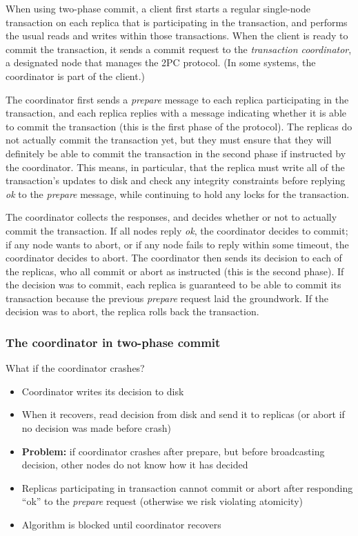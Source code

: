 When using two-phase commit, a client first starts a regular single-node transaction on each replica that is participating in the transaction, and performs the usual reads and writes within those transactions.
When the client is ready to commit the transaction, it sends a commit request to the \emph{transaction coordinator}, a designated node that manages the 2PC protocol.
(In some systems, the coordinator is part of the client.)

The coordinator first sends a \emph{prepare} message to each replica participating in the transaction, and each replica replies with a message indicating whether it is able to commit the transaction (this is the first phase of the protocol).
The replicas do not actually commit the transaction yet, but they must ensure that they will definitely be able to commit the transaction in the second phase if instructed by the coordinator.
This means, in particular, that the replica must write all of the transaction's updates to disk and check any integrity constraints before replying \emph{ok} to the \emph{prepare} message, while continuing to hold any locks for the transaction.

The coordinator collects the responses, and decides whether or not to actually commit the transaction.
If all nodes reply \emph{ok}, the coordinator decides to commit; if any node wants to abort, or if any node fails to reply within some timeout, the coordinator decides to abort.
The coordinator then sends its decision to each of the replicas, who all commit or abort as instructed (this is the second phase).
If the decision was to commit, each replica is guaranteed to be able to commit its transaction because the previous \emph{prepare} request laid the groundwork.
If the decision was to abort, the replica rolls back the transaction.

\begin{frame}
    \label{s:2pc-coordinator}
    \frametitle{The coordinator in two-phase commit}
    What if the coordinator crashes?\pause
    \begin{itemize}
        \item Coordinator writes its decision to disk
        \item When it recovers, read decision from disk and send it to replicas
            (or abort if no decision was made before crash)\pause
        \item \textbf{Problem:} if coordinator crashes after prepare, but before broadcasting decision, other nodes do not know how it has decided\pause
        \item Replicas participating in transaction cannot commit or abort after responding ``ok'' to the \emph{prepare} request (otherwise we risk violating atomicity)\pause
        \item Algorithm is blocked until coordinator recovers
    \end{itemize}
\end{frame}
\label{l:2pc-coordinator}

